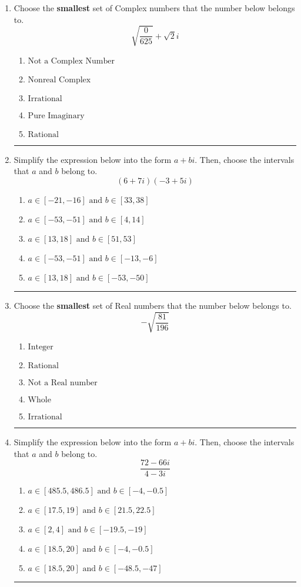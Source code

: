 \documentclass[14pt]{extbook}
\newcommand{\litem}[1]{\item#1\hspace*{-1cm}\rule{\textwidth}{0.4pt}}
\begin{document}
\begin{enumerate}
{\begin{enumerate}[label=\Alph*.]
\end{enumerate} }
\litem{
Choose the \textbf{smallest} set of Complex numbers that the number below belongs to.\[ \sqrt{\frac{0}{625}}+\sqrt{2}i \]\begin{enumerate}[label=\Alph*.]
\item \( \text{Not a Complex Number} \)
\item \( \text{Nonreal Complex} \)
\item \( \text{Irrational} \)
\item \( \text{Pure Imaginary} \)
\item \( \text{Rational} \)

\end{enumerate} }
\litem{
Simplify the expression below into the form $a+bi$. Then, choose the intervals that $a$ and $b$ belong to.\[ (6 + 7 i)(-3 + 5 i) \]\begin{enumerate}[label=\Alph*.]
\item \( a \in [-21, -16] \text{ and } b \in [33, 38] \)
\item \( a \in [-53, -51] \text{ and } b \in [4, 14] \)
\item \( a \in [13, 18] \text{ and } b \in [51, 53] \)
\item \( a \in [-53, -51] \text{ and } b \in [-13, -6] \)
\item \( a \in [13, 18] \text{ and } b \in [-53, -50] \)

\end{enumerate} }
\litem{
Choose the \textbf{smallest} set of Real numbers that the number below belongs to.\[ -\sqrt{\frac{81}{196}} \]\begin{enumerate}[label=\Alph*.]
\item \( \text{Integer} \)
\item \( \text{Rational} \)
\item \( \text{Not a Real number} \)
\item \( \text{Whole} \)
\item \( \text{Irrational} \)

\end{enumerate} }
\litem{
Simplify the expression below into the form $a+bi$. Then, choose the intervals that $a$ and $b$ belong to.\[ \frac{72 - 66 i}{4 - 3 i} \]\begin{enumerate}[label=\Alph*.]
\item \( a \in [485.5, 486.5] \text{ and } b \in [-4, -0.5] \)
\item \( a \in [17.5, 19] \text{ and } b \in [21.5, 22.5] \)
\item \( a \in [2, 4] \text{ and } b \in [-19.5, -19] \)
\item \( a \in [18.5, 20] \text{ and } b \in [-4, -0.5] \)
\item \( a \in [18.5, 20] \text{ and } b \in [-48.5, -47] \)


\end{enumerate}}
\end{enumerate}
\end{document}
